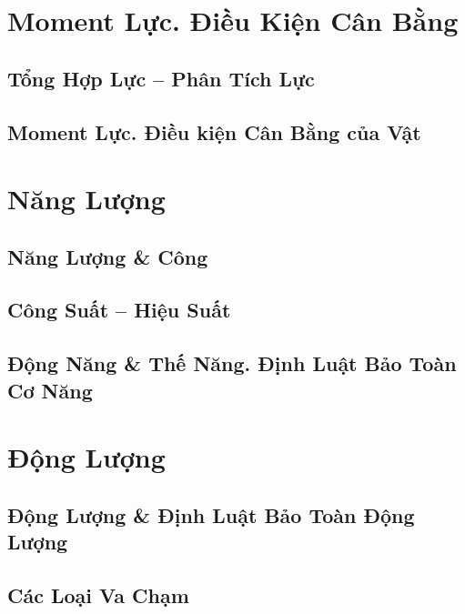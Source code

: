 \documentclass[oneside]{book}
\numberwithin{equation}{section}
\begin{document}

\chapter{Moment Lực. Điều Kiện Cân Bằng}

\section{Tổng Hợp Lực -- Phân Tích Lực}

\section{Moment Lực. Điều kiện Cân Bằng của Vật}


\chapter{Năng Lượng}

\section{Năng Lượng \& Công}

\section{Công Suất -- Hiệu Suất}

\section{Động Năng \& Thế Năng. Định Luật Bảo Toàn Cơ Năng}


\chapter{Động Lượng}

\section{Động Lượng \& Định Luật Bảo Toàn Động Lượng}

\section{Các Loại Va Chạm}
\end{document}
